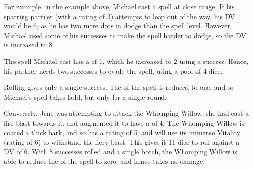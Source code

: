 For example, in the example above, Michael cast a \levelOne{} spell at close range. If his sparring partner (with a  rating of 3) attempts to leap out of the way, his DV would be 6, as he has two more dots in dodge than the spell level. However, Michael used some of his successes to make the spell harder to dodge, so the DV is increased to 8. 

The spell Michael cast has a  of 1, which he increased to 2 using a success. Hence, his partner needs two successes to evade the spell, using a  pool of 4 dice. 

Rolling  gives only a single success. The  of the spell is reduced to one, and so Michael's spell takes hold, but only for a single round. 

Conversely, Jane was attempting to attack the Whomping Willow, she had cast a \levelThree{} fire blast towards it, and augmented it to have a  of 4. The Whomping Willow is coated a thick bark, and so has a  rating of 5, and will use its immense Vitality (rating of 6) to withstand the fiery blast. This gives it 11 dice to roll against a DV of 6. With 8 successes rolled and a single botch, the Whomping Willow is able to reduce the  of the spell to zero, and hence takes no damage. 


